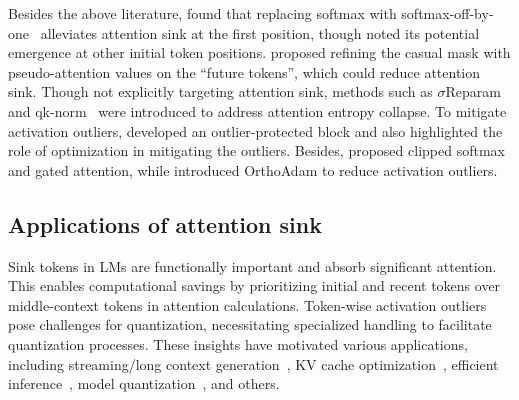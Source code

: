 Besides the above literature, \citet{xiao2023efficient, kaul2024attention} found that replacing softmax with softmax-off-by-one~\citep{miller2023attention} alleviates attention sink at the first position, though \citet{xiao2023efficient} noted its potential emergence at other initial token positions. \citet{yin2024stablemask} proposed refining the casual mask with pseudo-attention values on the ``future tokens'', which could reduce attention sink. Though not explicitly targeting attention sink, methods such as $\sigma$Reparam~\citep{zhai2023stabilizing} and qk-norm~\citep{dehghani2023scaling} were introduced to address attention entropy collapse. To mitigate activation outliers, \citet{he2024understanding} developed an outlier-protected block and also highlighted the role of optimization in mitigating the outliers. Besides, \citet{bondarenko2023quantizable} proposed clipped softmax and gated attention, while \citet{kaul2024attention} introduced OrthoAdam to reduce activation outliers.




\vspace{-0.05cm}
\subsection{Applications of attention sink}
\vspace{-0.05cm}
Sink tokens in LMs are functionally important and absorb significant attention. This enables computational savings by prioritizing initial and recent tokens over middle-context tokens in attention calculations. Token-wise activation outliers pose challenges for quantization, necessitating specialized handling to facilitate quantization processes. These insights have motivated various applications, including streaming/long context generation~\citep{xiao2023efficient,han2024lm,yang2024seed}, KV cache optimization~\citep{ge2023model,wan2024look,wu2024layer}, efficient inference~\citep{zhang2024q,chen2024image}, model quantization~\citep{liu2024intactkv,huang2024slim}, and others.



